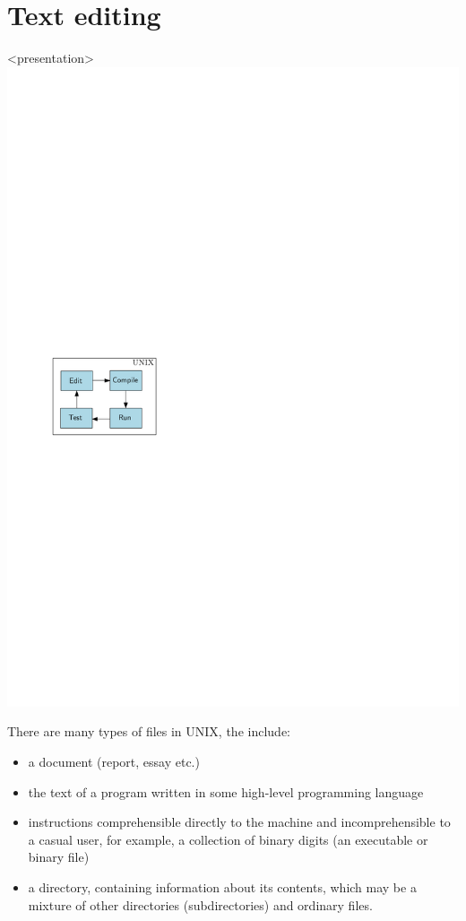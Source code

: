 
\section{Text editing} %

\begin{frame}<presentation>
\includegraphics[page=2,width=\textwidth]{flow}
\end{frame}

There are many types of files in UNIX, the include:
\begin{itemize}
\item a document (report, essay etc.)
\item the text of a program written in some high-level programming language
\item instructions comprehensible directly to the machine and incomprehensible 
to a casual user, for example, a collection of binary digits (an executable or 
binary file)
\item a directory, containing information about its contents, which may be a 
mixture of other directories (subdirectories) and ordinary files.
\end{itemize}


